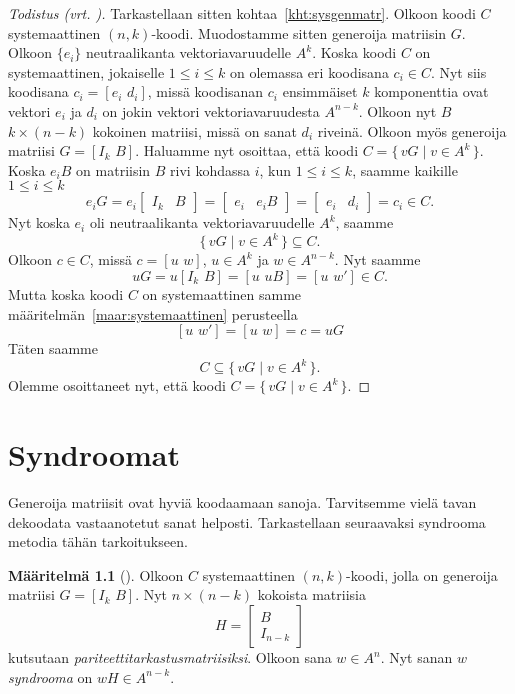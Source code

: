 \documentclass[a4paper,12pt,leqno,oneside]{report} %
\theoremstyle{plain}
\theoremstyle{definition}
\newtheorem{maaritelma}{Määritelmä}[chapter]
\theoremstyle{remark}
\numberwithin{equation}{chapter}
\begin{document}
\begin{proof}[Todistus \upshape(vrt. {\cite[s.~498]{PA}})]
        Tarkastellaan sitten kohtaa~\ref{kht:sysgenmatr}. Olkoon koodi $C$ systemaattinen $(n, k)$-koodi. Muodostamme sitten generoija matriisin $G$. Olkoon $\{e_i\}$ neutraalikanta vektoriavaruudelle $A^k$. Koska koodi $C$ on systemaattinen, jokaiselle $1 \le i \le k$ on olemassa eri koodisana $c_i \in C$. Nyt siis koodisana $c_i = [e_i \,\, d_i]$, missä koodisanan $c_i$ ensimmäiset $k$ komponenttia ovat vektori $e_i$ ja $d_i$ on jokin vektori vektoriavaruudesta $A^{n-k}$. Olkoon nyt $B$ $k \times (n-k)$ kokoinen matriisi, missä on sanat $d_i$ riveinä. Olkoon myös generoija matriisi $G = [I_k\,\,B]$. Haluamme nyt osoittaa, että koodi $C = \{\,vG \mid v \in A^k\,\}$. Koska $e_i B$ on matriisin $B$ rivi kohdassa $i$, kun $1 \le i \le k$, saamme kaikille $1 \le i \le k$
        \[
            e_i G = e_i
            \begin{bmatrix}
                I_k & B
            \end{bmatrix}
            =
            \begin{bmatrix}
                e_i & e_i B
            \end{bmatrix}
            =
            \begin{bmatrix}
                e_i & d_i
            \end{bmatrix}
            =
            c_i \in C.
        \]
        Nyt koska $e_i$ oli neutraalikanta vektoriavaruudelle $A^k$, saamme
        \[
            \{\,vG \mid v \in A^k\,\} \subseteq C.
        \]
        Olkoon $c \in C$, missä $c = [u\,\,w]$, $u \in A^k$ ja $w \in A^{n-k}$. Nyt saamme
        \[
            uG = u[I_k\,\,B] = [u\,\,uB] = [u\,\,w'] \in C.
        \]
        Mutta koska koodi $C$ on systemaattinen samme määritelmän~\ref{maar:systemaattinen} perusteella
        \[
            [u\,\,w'] = [u\,\,w] = c = uG
        \]
        Täten saamme
        \[
            C \subseteq \{\,vG \mid v \in A^k\,\}.
        \]
        Olemme osoittaneet nyt, että koodi $C = \{\,vG \mid v \in A^k\,\}$.
    \end{proof} 

    \chapter{Syndroomat}
    Generoija matriisit ovat hyviä koodaamaan sanoja. Tarvitsemme vielä tavan dekoodata vastaanotetut sanat helposti. Tarkastellaan seuraavaksi syndrooma metodia tähän tarkoitukseen.
    \begin{maaritelma}[{\cite[s.~499]{PA}}]\label{maar:parcheckmatrix}
        Olkoon $C$ systemaattinen $(n, k)$-koodi, jolla on generoija matriisi $G = [I_k\,\,B]$. Nyt $n \times (n-k)$ kokoista matriisia
        \[
            H =
            \begin{bmatrix}
                B \\
                I_{n-k}
            \end{bmatrix}
        \]
        kutsutaan \emph{pariteettitarkastusmatriisiksi}. Olkoon sana $w \in A^n$. Nyt sanan $w$ \emph{syndrooma} on $wH \in A^{n-k}$.
    \end{maaritelma}
\end{document}
